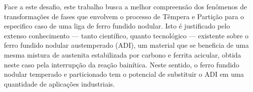 Face a este desafio, este trabalho busca a melhor compreensão dos fenômenos de transformações de fases que envolvem o processo de Têmpera e Partição para o especifico caso de uma liga de ferro fundido nodular. Isto é justificado pelo extenso conhecimento --- tanto científico, quanto tecnológico --- existente sobre o ferro fundido nodular austemperado (ADI), um material que se beneficia de uma mesma mistura de austenita estabilizada por carbono e ferrita acicular, obtida neste caso pela interrupção da reação bainítica. Neste sentido, o ferro fundido nodular temperado e particionado tem o potencial de substituir o ADI em uma quantidade de aplicações industriais.
